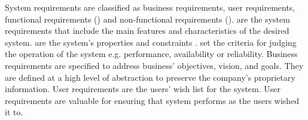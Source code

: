 System requirements are classified as business requirements, user
requirements, functional requirements (\FR) and non-functional requirements
(\NFR). \FR are the system requirements that include the
main features and characteristics of the desired system. \NFR are the
system's properties and constraints \cite{Davis:1993, Glinz}. \NFR set the
criteria for judging the operation of the system e.g.
performance, availability or reliability. Business requirements are specified to
address business' objectives, vision, and goals. They are defined at a high
level of abstraction to preserve the company's proprietary information.
User requirements are the users' wish list for the system. User requirements are
valuable for ensuring that system performs as the users wished it to.
